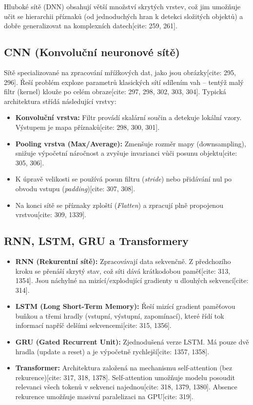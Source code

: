 \documentclass{article}
\begin{document}
Hluboké sítě (DNN) obsahují větší množství skrytých vrstev, což jim umožňuje učit se hierarchii příznaků (od jednoduchých hran k detekci složitých objektů) a dobře generalizovat na komplexních datech[cite: 259, 261]. 

\subsection{CNN (Konvoluční neuronové sítě)}
Sítě specializované na zpracování mřížkových dat, jako jsou obrázky[cite: 295, 296]. Řeší problém exploze parametrů klasických sítí sdílením vah – tentýž malý filtr (kernel) klouže po celém obraze[cite: 297, 298, 302, 303, 304]. Typická architektura střídá následující vrstvy:
\begin{itemize}
    \item \textbf{Konvoluční vrstva:} Filtr provádí skalární součin a detekuje lokální vzory. Výstupem je mapa příznaků[cite: 298, 300, 301]. 
    \item \textbf{Pooling vrstva (Max/Average):} Zmenšuje rozměr mapy (downsampling), snižuje výpočetní náročnost a zvyšuje invarianci vůči posunu objektu[cite: 305, 306].
    \item K úpravě velikosti se používá posun filtru (\textit{stride}) nebo přidávání nul po obvodu vstupu (\textit{padding})[cite: 307, 308].
    \item Na konci sítě se příznaky zploští (\textit{Flatten}) a zpracují plně propojenou vrstvou[cite: 309, 1339].
\end{itemize}

\subsection{RNN, LSTM, GRU a Transformery}
\begin{itemize}
    \item \textbf{RNN (Rekurentní sítě):} Zpracovávají data sekvenčně. Z předchozího kroku se přenáší skrytý stav, což síti dává krátkodobou paměť[cite: 313, 1354]. Jsou náchylné na mizící/explodující gradienty u dlouhých sekvencí[cite: 314].
    \item \textbf{LSTM (Long Short-Term Memory):} Řeší mizící gradient paměťovou buňkou a třemi hradly (vstupní, výstupní, zapomínací), které řídí tok informací napříč delšími sekvencemi[cite: 315, 1356].
    \item \textbf{GRU (Gated Recurrent Unit):} Zjednodušená verze LSTM. Má pouze dvě hradla (update a reset) a je výpočetně rychlejší[cite: 1357, 1358].
    \item \textbf{Transformer:} Architektura založená na mechanismu self-attention (bez rekurence)[cite: 317, 318, 1378]. Self-attention umožňuje modelu posoudit relevanci všech tokenů v sekvenci najednou[cite: 318, 1379, 1380]. Absence rekurence umožňuje masivní paralelizaci na GPU[cite: 319].
\end{itemize}
\end{document}
